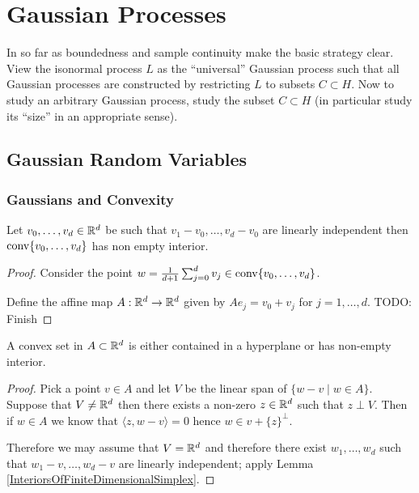 \chapter{Gaussian Processes}

In so far as boundedness and sample continuity make the basic strategy clear.  View the isonormal process $L$ as the ``universal'' Gaussian process such that all Gaussian processes are constructed by restricting $L$ to subsets $C \subset H$.  Now to study an arbitrary Gaussian process, study the subset $C \subset H$ (in particular study its ``size'' in an appropriate sense).

\section{Gaussian Random Variables}

\subsection{Gaussians and Convexity}

\begin{lem}\label{InteriorsOfFiniteDimensionalSimplex}Let $v_0, \dotsc, v_d \in \mathbb{R}^d$ be such that $v_1 - v_0, \dotsc, v_d - v_0$ are linearly independent then
$\operatorname*{conv}\{v_0, \dotsc, v_d\}$ has non empty interior.
\end{lem}
\begin{proof}
Consider the point $w = \frac{1}{d+1} \sum_{j=0}^d v_j \in \operatorname*{conv}\{v_0, \dotsc, v_d\}$.  

Define the affine map $A : \mathbb{R}^d \to \mathbb{R}^d$ given by $A e_j = v_0 + v_j$ for $j=1, \dotsc, d$.  
TODO: Finish
\end{proof}

\begin{prop}\label{InteriorsOfFiniteDimensionalConvexSets}A convex set in $A \subset \mathbb{R}^d$ is either contained in a hyperplane or has non-empty interior.
\end{prop}
\begin{proof}
Pick a point $v \in A$ and let $V$ be the linear span of $\lbrace w - v \mid w \in A \rbrace$.  Suppose that $V \neq \mathbb{R}^d$ then there exists a non-zero $z \in \mathbb{R}^d$ such that $z \perp V$.  Then if $w \in A$ we know that $\langle z, w - v \rangle = 0$ hence $w \in v + \lbrace z \rbrace^{\perp}$.  

Therefore we may assume that $V = \mathbb{R}^d$ and therefore there exist $w_1, \dotsc, w_d$ such that $w_1 -v, \dotsc, w_d - v$ are linearly independent; apply Lemma \ref{InteriorsOfFiniteDimensionalSimplex}.
\end{proof}

